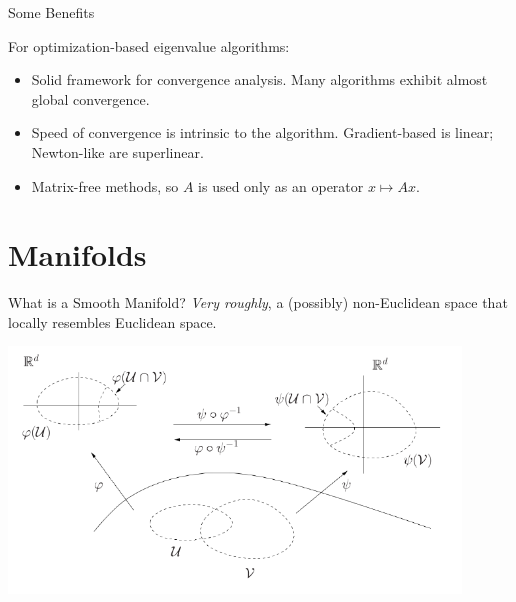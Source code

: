 \documentclass[xcolor=dvipsnames,t]{beamer} %
\newcommand{\reals}{\mathbb{R}}
\begin{document}


\begin{frame}{Some Benefits}
   
   For optimization-based eigenvalue algorithms:\\
   \begin{itemize}
      \item Solid framework for convergence analysis.  Many algorithms exhibit almost global convergence.
      \item Speed of convergence is intrinsic to the algorithm.  Gradient-based is linear; Newton-like are superlinear.
      \item Matrix-free methods, so $A$ is used only as an operator $x\mapsto Ax$.
   \end{itemize}
\end{frame}


\section{Manifolds}
   \begin{frame}{What is a Smooth Manifold?}
   \emph{Very roughly}, a (possibly) non-Euclidean space that locally resembles Euclidean space.\\[.5em]

   \begin{center}
      \includegraphics[width=0.9\textwidth]{figures/charts.pdf}
   \end{center}
\end{frame}
\end{document}
